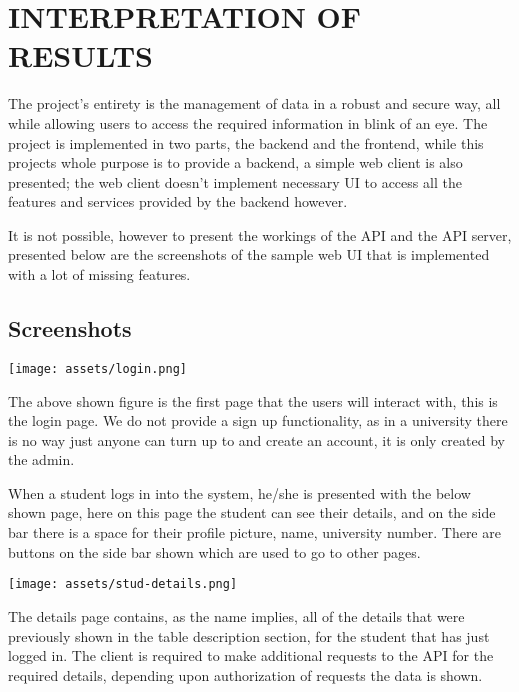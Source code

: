 \section{INTERPRETATION OF RESULTS}

The project's entirety is the management of data in a robust and secure way, all
while allowing users to access the required information in blink of an eye.
The project is implemented in two parts, the backend and the frontend, while
this projects whole purpose is to provide a backend, a simple web client is also
presented; the web client doesn't implement necessary UI to access all the
features and services provided by the backend however.

It is not possible, however to present the workings of the API and the API
server, presented below are the screenshots of the sample web UI that is
implemented with a lot of missing features.

\subsection{Screenshots}

\begin{center}
    \texttt{[image: assets/login.png]}
\end{center}

The above shown figure is the first page that the users will interact with, this
is the login page. We do not provide a sign up functionality, as in a university
there is no way just anyone can turn up to and create an account, it is only
created by the admin.

When a student logs in into the system, he/she is presented with the below shown
page, here on this page the student can see their details, and on the side bar
there is a space for their profile picture, name, university number. There are
buttons on the side bar shown which are used to go to other pages.

\begin{center}
    \texttt{[image: assets/stud-details.png]}
\end{center}

The details page contains, as the name implies, all of the details that were
previously shown in the table description section, for the student that has just
logged in. The client is required to make additional requests to the API for the
required details, depending upon authorization of requests the data is shown.

